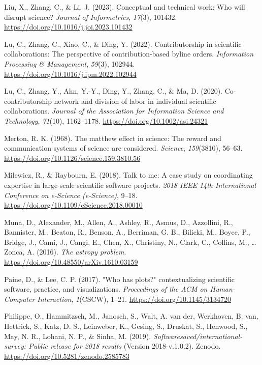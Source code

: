 \documentclass[
  number,
  3p,
  onecolumn]{elsarticle}
\newlength{\cslhangindent}
\newenvironment{CSLReferences}[2] %
 {\begin{list}{}{%
  \setlength{\itemindent}{0pt}
  \setlength{\leftmargin}{0pt}
  \setlength{\parsep}{0pt}
  \ifodd #1
   \setlength{\leftmargin}{\cslhangindent}
   \setlength{\itemindent}{-1\cslhangindent}
  \fi
  \setlength{\itemsep}{#2\baselineskip}}}
 {\end{list}}
\begin{document}
\begin{CSLReferences}{1}{0}
Liu, X., Zhang, C., \& Li, J. (2023). Conceptual and technical work: Who
will disrupt science? \emph{Journal of Informetrics}, \emph{17}(3),
101432. \url{https://doi.org/10.1016/j.joi.2023.101432}

Lu, C., Zhang, C., Xiao, C., \& Ding, Y. (2022). Contributorship in
scientific collaborations: The perspective of contribution-based byline
orders. \emph{Information Processing \& Management}, \emph{59}(3),
102944. \url{https://doi.org/10.1016/j.ipm.2022.102944}

Lu, C., Zhang, Y., Ahn, Y.-Y., Ding, Y., Zhang, C., \& Ma, D. (2020).
Co-contributorship network and division of labor in individual
scientific collaborations. \emph{Journal of the Association for
Information Science and Technology}, \emph{71}(10), 1162--1178.
\url{https://doi.org/10.1002/asi.24321}

Merton, R. K. (1968). The matthew effect in science: The reward and
communication systems of science are considered. \emph{Science},
\emph{159}(3810), 56--63.
\url{https://doi.org/10.1126/science.159.3810.56}

Milewicz, R., \& Raybourn, E. (2018). Talk to me: A case study on
coordinating expertise in large-scale scientific software projects.
\emph{2018 IEEE 14th International Conference on e-Science (e-Science)},
9--18. \url{https://doi.org/10.1109/eScience.2018.00010}

Muna, D., Alexander, M., Allen, A., Ashley, R., Asmus, D., Azzollini,
R., Bannister, M., Beaton, R., Benson, A., Berriman, G. B., Bilicki, M.,
Boyce, P., Bridge, J., Cami, J., Cangi, E., Chen, X., Christiny, N.,
Clark, C., Collins, M., \ldots{} Zonca, A. (2016). \emph{The astropy
problem}. \url{https://doi.org/10.48550/arXiv.1610.03159}

Paine, D., \& Lee, C. P. (2017). "Who has plots?" contextualizing
scientific software, practice, and visualizations. \emph{Proceedings of
the ACM on Human-Computer Interaction}, \emph{1}(CSCW), 1--21.
\url{https://doi.org/10.1145/3134720}

Philippe, O., Hammitzsch, M., Janosch, S., Walt, A. van der, Werkhoven,
B. van, Hettrick, S., Katz, D. S., Leinweber, K., Gesing, S., Druskat,
S., Henwood, S., May, N. R., Lohani, N. P., \& Sinha, M. (2019).
\emph{Softwaresaved/international-survey: Public release for 2018
results} (Version 2018-v.1.0.2). Zenodo.
\url{https://doi.org/10.5281/zenodo.2585783}


\end{CSLReferences}
\end{document}
